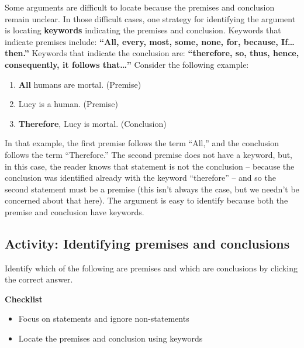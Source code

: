 \documentclass[
]{book}
\providecommand{\tightlist}{%
  \setlength{\itemsep}{0pt}\setlength{\parskip}{0pt}}
\begin{document}
Some arguments are difficult to locate because the premises and conclusion remain unclear. In those difficult cases, one strategy for identifying the argument is locating \textbf{keywords} indicating the premises and conclusion. Keywords that indicate premises include: \textbf{``All, every, most, some, none, for, because, If\ldots then.''} Keywords that indicate the conclusion are: \textbf{``therefore, so, thus, hence, consequently, it follows that\ldots{}''} Consider the following example:

\begin{enumerate}
\def\labelenumi{\arabic{enumi}.}
\tightlist
\item
  \textbf{All} humans are mortal. (Premise)\\
\item
  Lucy is a human. (Premise)\\
\item
  \textbf{Therefore}, Lucy is mortal. (Conclusion)
\end{enumerate}

In that example, the first premise follows the term ``All,'' and the conclusion follows the term ``Therefore.'' The second premise does not have a keyword, but, in this case, the reader knows that statement is not the conclusion -- because the conclusion was identified already with the keyword ``therefore'' -- and so the second statement must be a premise (this isn't always the case, but we needn't be concerned about that here). The argument is easy to identify because both the premise and conclusion have keywords.

\hypertarget{activity-identifying-premises-and-conclusions}{%
\subsection*{Activity: Identifying premises and conclusions}\label{activity-identifying-premises-and-conclusions}}

\begin{reflect}
Identify which of the following are premises and which are conclusions by clicking the correct answer.

\textbf{Checklist}

\begin{itemize}
\tightlist
\item
  Focus on statements and ignore non-statements\\
\item
  Locate the premises and conclusion using keywords
\end{itemize}
\end{reflect}
\end{document}
